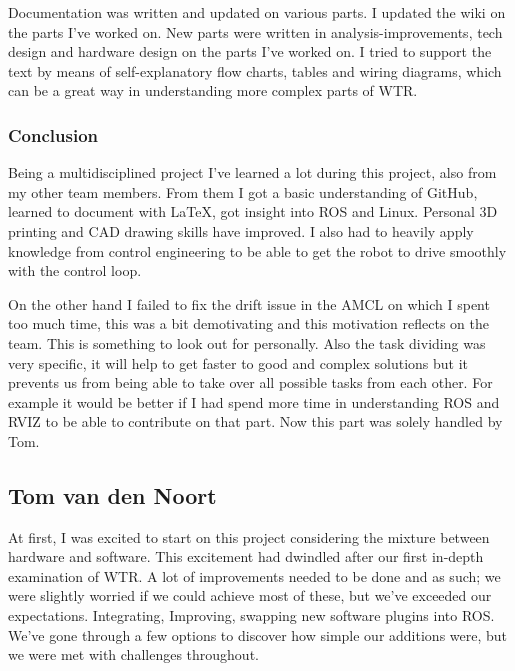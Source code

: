 Documentation was written and updated on various parts. 
I updated the wiki on the parts I've worked on. 
New parts were written in analysis-improvements, tech design and hardware design on the parts I've worked on. 
I tried to support the text by means of self-explanatory flow charts, tables and wiring diagrams, which can be a great way in understanding more complex parts of WTR. 

\subsubsection{Conclusion}
Being a multidisciplined project I've learned a lot during this project, also from my other team members.
From them I got a basic understanding of GitHub, learned to document with \LaTeX, got insight into ROS and Linux. 
Personal 3D printing and CAD drawing skills have improved. 
I also had to heavily apply knowledge from control engineering to be able to get the robot to drive smoothly with the control loop.

On the other hand I failed to fix the drift issue in the AMCL on which I spent too much time, this was a bit demotivating and this motivation reflects on the team. This is something to look out for personally. 
Also the task dividing was very specific, it will help to get faster to good and complex solutions but it prevents us from being able to take over all possible tasks from each other. 
For example it would be better if I had spend more time in understanding ROS and RVIZ to be able to contribute on that part. 
Now this part was solely handled by Tom.

\newpage

\subsection{Tom van den Noort}
At first, I was excited to start on this project considering the mixture between hardware and software. 
This excitement had dwindled after our first in-depth examination of WTR. 
A lot of improvements needed to be done and as such; we were slightly worried if we could achieve most of these, but we've exceeded our expectations.
Integrating, Improving, swapping new software plugins into ROS. We've gone through a few options to discover how simple our additions were, but we were met with challenges throughout.

